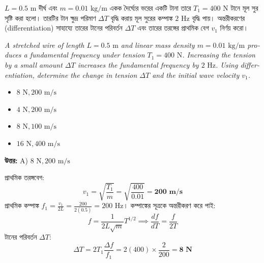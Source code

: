 \documentclass[12pt, a4paper]{article}
\begin{document}
\vspace{2em}

\begin{tcolorbox}[questionbox={প্রশ্ন (Question) 6}]
    \noindent
    $L = 0.5\text{ m}$ দীর্ঘ এবং $m = 0.01\text{ kg/m}$ একক দৈর্ঘ্যের ভরের একটি টানা তারে $T_1 = 400\text{ N}$ টানে মূল সুর সৃষ্টি করা হলো। তারটির টান ক্ষুদ্র পরিমাণ $\Delta T$ বৃদ্ধি করায় মূল সুরের কম্পাঙ্ক $2\text{ Hz}$ বৃদ্ধি পায়। অন্তরীকরণের (differentiation) সাহায্যে তারের টানের পরিবর্তন $\Delta T$ এবং তারের তরঙ্গের প্রাথমিক বেগ $v_1$ নির্ণয় করো।
    
    \vspace{0.8em}
    \begin{english}
    \noindent\textit{\color{darkgray}
    A stretched wire of length $L = 0.5\text{ m}$ and linear mass density $m = 0.01\text{ kg/m}$ produces a fundamental frequency under tension $T_1 = 400\text{ N}$. Increasing the tension by a small amount $\Delta T$ increases the fundamental frequency by $2\text{ Hz}$. Using differentiation, determine the change in tension $\Delta T$ and the initial wave velocity $v_1$.
    }
    \end{english}
\end{tcolorbox}

\begin{itemize}[label={}, leftmargin=1cm, itemsep=0.5em]
    \item[\textbf{A)}] $8\text{ N}, 200\text{ m/s}$
    \item[\textbf{B)}] $4\text{ N}, 200\text{ m/s}$
    \item[\textbf{C)}] $8\text{ N}, 100\text{ m/s}$
    \item[\textbf{D)}] $16\text{ N}, 400\text{ m/s}$
\end{itemize}

\vspace{0.5em}
\begin{tcolorbox}[answerbox]
    \textbf{\color{success} উত্তর:} A) $8\text{ N}, 200\text{ m/s}$
\end{tcolorbox}
\vspace{1em}

\begin{tcolorbox}[solutionbox={সমাধান (Solution)}]
    \noindent
    প্রাথমিক তরঙ্গবেগ:
    \[ v_1 = \sqrt{\frac{T_1}{m}} = \sqrt{\frac{400}{0.01}} = \mathbf{200\text{ m/s}} \]
    প্রাথমিক কম্পাঙ্ক $f_1 = \frac{v_1}{2L} = \frac{200}{2(0.5)} = 200\text{ Hz}$। কম্পাঙ্কের সূত্রকে অন্তরীকরণ করে পাই:
    \[ f = \frac{1}{2L\sqrt{m}} T^{1/2} \implies \frac{df}{dT} = \frac{f}{2T} \]
    টানের পরিবর্তন $\Delta T$:
    \[ \Delta T = 2T_1 \frac{\Delta f}{f_1} = 2(400) \times \frac{2}{200} = \mathbf{8\text{ N}} \]
\end{tcolorbox}
\end{document}
